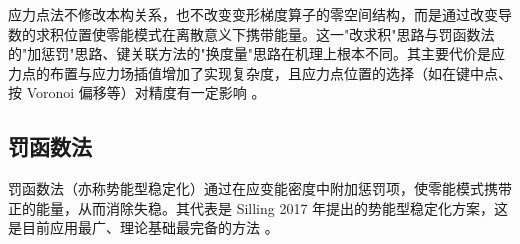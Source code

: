 \begin{remark}
  应力点法不修改本构关系，也不改变变形梯度算子的零空间结构，而是通过改变导数的求积位置使零能模式在离散意义下携带能量。这一"改求积"思路与罚函数法的"加惩罚"思路、键关联方法的"换度量"思路在机理上根本不同。其主要代价是应力点的布置与应力场插值增加了实现复杂度，且应力点位置的选择（如在键中点、按 Voronoi 偏移等）对精度有一定影响 \cite{LuoSundararaghavan2018}。
\end{remark}

\subsection{罚函数法}\label{sec:penalty-methods}

罚函数法（亦称势能型稳定化）通过在应变能密度中附加惩罚项，使零能模式携带正的能量，从而消除失稳。其代表是 Silling 2017 年提出的势能型稳定化方案，这是目前应用最广、理论基础最完备的方法 \cite{Silling2017}。

